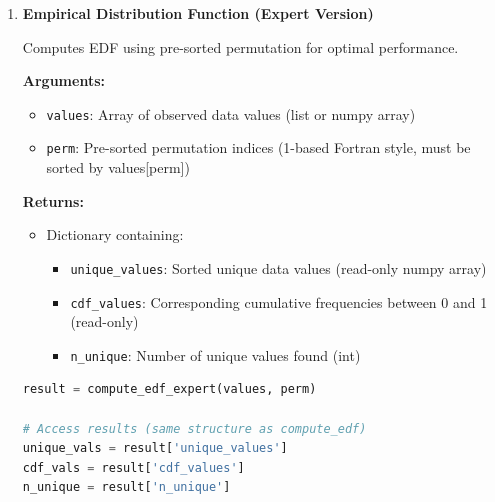 \begin{enumerate}
\begin{enumerate}
\begin{lstlisting}[language=Python, caption={Empirical Distribution Function Computation}]
cdf_vals = result['cdf_values']        
# Cumulative distribution values  

n_unique = result['n_unique']          
# Number of unique values
                  \end{lstlisting}
                  
            \item \textbf{Empirical Distribution Function (Expert Version)}
                  
                  Computes EDF using pre-sorted permutation for optimal performance.
                  
                  \textbf{Arguments:}
                  \begin{itemize}
                    \item \texttt{values}: Array of observed data values (list or numpy
                          array)
                          
                    \item \texttt{perm}: Pre-sorted permutation indices (1-based Fortran
                          style, must be sorted by values[perm])
                  \end{itemize}
                  \textbf{Returns:}
                  \begin{itemize}
                    \item Dictionary containing:
                          \begin{itemize}
                            \item \texttt{unique\_values}: Sorted unique data values (read-only
                                  numpy array)
                                  
                            \item \texttt{cdf\_values}: Corresponding cumulative frequencies
                                  between 0 and 1 (read-only)
                                  
                            \item \texttt{n\_unique}: Number of unique values found (int)
                          \end{itemize}
                  \end{itemize}
                  \begin{lstlisting}[language=Python, caption={Expert EDF Computation with Pre-sorted Permutation}]
result = compute_edf_expert(values, perm)

# Access results (same structure as compute_edf)
unique_vals = result['unique_values']
cdf_vals = result['cdf_values']
n_unique = result['n_unique']
                  \end{lstlisting}
          \end{enumerate}
\end{enumerate}